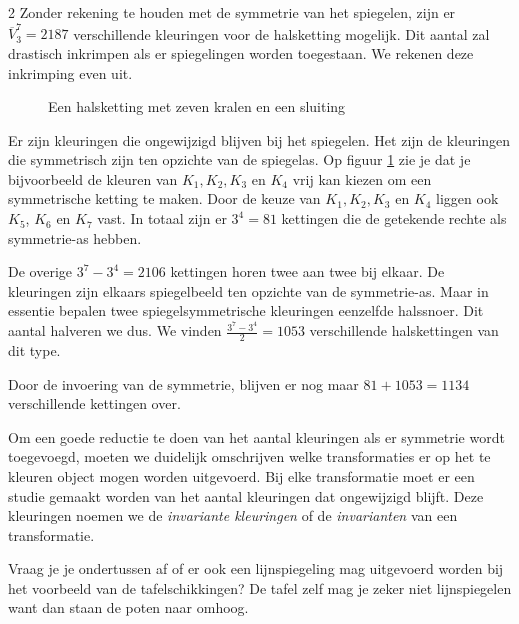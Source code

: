 \begin{multicols}{2}
Zonder rekening te houden met de symmetrie van het spiegelen, zijn er $\overline{V}_3^7=2187$ verschillende kleuringen voor de halsketting mogelijk. Dit aantal zal drastisch inkrimpen als er spiegelingen worden toegestaan. We rekenen deze inkrimping even uit.
 
\begin{figure}[H]
\centering
{}
\caption{Een halsketting met zeven kralen en een sluiting}
\label{kralen}
\end{figure}

Er zijn kleuringen die ongewijzigd blijven bij het spiegelen. Het zijn de kleuringen die symmetrisch zijn ten opzichte van de spiegelas. Op figuur \ref{kralen} zie je dat je bijvoorbeeld de kleuren van $K_1, K_2, K_3$ en $K_4$ vrij kan kiezen om een symmetrische ketting te maken. Door de keuze van $K_1, K_2, K_3$ en $K_4$ liggen ook $K_5$, $K_6$ en $K_7$ vast. In totaal zijn er $3^4=81$ kettingen die de getekende rechte als symmetrie-as hebben. 

De overige $3^7-3^4=2106$ kettingen horen twee aan twee bij elkaar. De kleuringen zijn elkaars spiegelbeeld ten opzichte van de symmetrie-as. Maar in essentie bepalen twee spiegelsymmetrische kleuringen eenzelfde halssnoer. Dit aantal halveren we dus. We vinden $\frac{3^7-3^4}{2}=1053$ verschillende halskettingen van dit type.

Door de invoering van de symmetrie, blijven er nog maar $81+1053=1134$ verschillende kettingen over. 

Om een goede reductie te doen van het aantal kleuringen als er symmetrie wordt toegevoegd, moeten we duidelijk omschrijven welke transformaties er op het te kleuren object mogen worden uitgevoerd. Bij elke transformatie moet er een studie gemaakt worden van het aantal kleuringen dat ongewijzigd blijft. Deze kleuringen noemen we de \emph{invariante kleuringen} of de \emph{invarianten} van een transformatie. 

Vraag je je ondertussen af of er ook een lijnspiegeling mag uitgevoerd worden bij het voorbeeld van de tafelschikkingen? De tafel zelf mag je zeker niet lijnspiegelen want dan staan de poten naar omhoog.


\end{multicols}
